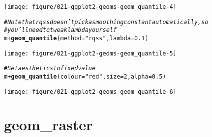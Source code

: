 \documentclass[a4paper,titlepage]{tufte-handout}\usepackage[]{graphicx}\usepackage[]{color}
\makeatletter
\def\maxwidth{ %
  \ifdim\Gin@nat@width>\linewidth
    \linewidth
  \else
    \Gin@nat@width
  \fi
}
\newcommand{\hlnum}[1]{\textcolor[rgb]{0.686,0.059,0.569}{#1}}%
\newcommand{\hlstr}[1]{\textcolor[rgb]{0.192,0.494,0.8}{#1}}%
\newcommand{\hlcom}[1]{\textcolor[rgb]{0.678,0.584,0.686}{\textit{#1}}}%
\newcommand{\hlopt}[1]{\textcolor[rgb]{0,0,0}{#1}}%
\newcommand{\hlstd}[1]{\textcolor[rgb]{0.345,0.345,0.345}{#1}}%
\newcommand{\hlkwc}[1]{\textcolor[rgb]{0.333,0.667,0.333}{#1}}%
\newcommand{\hlkwd}[1]{\textcolor[rgb]{0.737,0.353,0.396}{\textbf{#1}}}%
\newenvironment{kframe}{%
 \def\at@end@of@kframe{}%
 \ifinner\ifhmode%
  \def\at@end@of@kframe{\end{minipage}}%
  \begin{minipage}{\columnwidth}%
 \fi\fi%
 \def\FrameCommand##1{\hskip\@totalleftmargin \hskip-\fboxsep
 \colorbox{shadecolor}{##1}\hskip-\fboxsep
     \hskip-\linewidth \hskip-\@totalleftmargin \hskip\columnwidth}%
 \MakeFramed {\advance\hsize-\width
   \@totalleftmargin\z@ \linewidth\hsize
   \@setminipage}}%
 {\par\unskip\endMakeFramed%
 \at@end@of@kframe}
\newenvironment{knitrout}{}{} %
\makeatother
\begin{document}
\begin{knitrout}
\begin{kframe}
{\ttfamily\noindent\color{warningcolor}{\#\# Warning: Computation failed in `stat\_quantile()`:\\\#\# Package `quantreg` required for `stat\_quantile`.\\\#\# Please install and try again.}}\end{kframe}
\texttt{[image: figure/021-ggplot2-geoms-geom\_quantile-4]} 
\begin{kframe}\begin{alltt}
\hlcom{# Note that rqss doesn't pick a smoothing constant automatically, so}
\hlcom{# you'll need to tweak lambda yourself}
\hlstd{m} \hlopt{+} \hlkwd{geom_quantile}\hlstd{(}\hlkwc{method} \hlstd{=} \hlstr{"rqss"}\hlstd{,} \hlkwc{lambda} \hlstd{=} \hlnum{0.1}\hlstd{)}
\end{alltt}


{\ttfamily\noindent\color{warningcolor}{\#\# Warning: Computation failed in `stat\_quantile()`:\\\#\# Package `quantreg` required for `stat\_quantile`.\\\#\# Please install and try again.}}\end{kframe}
\texttt{[image: figure/021-ggplot2-geoms-geom\_quantile-5]} 
\begin{kframe}\begin{alltt}
\hlcom{# Set aesthetics to fixed value}
\hlstd{m} \hlopt{+} \hlkwd{geom_quantile}\hlstd{(}\hlkwc{colour} \hlstd{=} \hlstr{"red"}\hlstd{,} \hlkwc{size} \hlstd{=} \hlnum{2}\hlstd{,} \hlkwc{alpha} \hlstd{=} \hlnum{0.5}\hlstd{)}
\end{alltt}


{\ttfamily\noindent\color{warningcolor}{\#\# Warning: Computation failed in `stat\_quantile()`:\\\#\# Package `quantreg` required for `stat\_quantile`.\\\#\# Please install and try again.}}\end{kframe}
\texttt{[image: figure/021-ggplot2-geoms-geom\_quantile-6]} 

\end{knitrout}


\section{geom\_raster}
\end{document}
